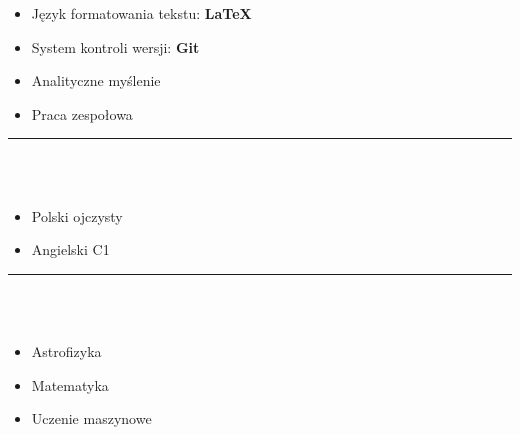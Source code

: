 \documentclass[10pt]{article}
\begin{document}
\begin{minipage}[t]{0.30\textwidth}
\begin{itemize}[leftmargin=*]
            \item Język formatowania tekstu: \textbf{LaTeX}
            \item System kontroli wersji: \textbf{Git}
            \item Analityczne myślenie
            \item Praca zespołowa 
        \end{itemize}
        \rule{6cm}{1pt} \\ \\
        \fontsize{10pt}{10pt}
        \begin{itemize}[leftmargin=*]
            \setlength{\parskip}{0pt}
            \item Polski ojczysty
            \item Angielski C1
        \end{itemize}
        \rule{6cm}{1pt} \\ \\
        \fontsize{10pt}{10pt}
        \begin{itemize}[leftmargin=*]
            \setlength{\parskip}{0pt}
            \item Astrofizyka
            \item Matematyka
            \item Uczenie maszynowe
        \end{itemize}
    \end{minipage}
    \hfill %
\end{document}
